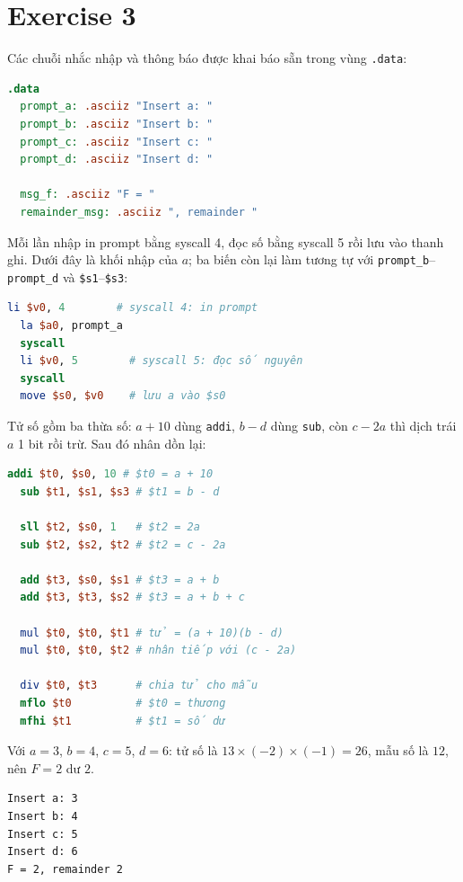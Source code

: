 \section{Exercise 3}

Các chuỗi nhắc nhập và thông báo được khai báo sẵn trong vùng \texttt{.data}:

\begin{lstlisting}[language=MIPS,numbers=none]
.data
  prompt_a: .asciiz "Insert a: "
  prompt_b: .asciiz "Insert b: "
  prompt_c: .asciiz "Insert c: "
  prompt_d: .asciiz "Insert d: "

  msg_f: .asciiz "F = "
  remainder_msg: .asciiz ", remainder "
\end{lstlisting}

Mỗi lần nhập in prompt bằng syscall 4, đọc số bằng syscall 5 rồi lưu vào thanh ghi. Dưới đây là khối nhập của $a$; ba biến còn lại làm tương tự với \texttt{prompt\_b}--\texttt{prompt\_d} và \texttt{\$s1}--\texttt{\$s3}:

\begin{lstlisting}[language=MIPS,numbers=none]
  li $v0, 4        # syscall 4: in prompt
  la $a0, prompt_a
  syscall
  li $v0, 5        # syscall 5: đọc số nguyên
  syscall
  move $s0, $v0    # lưu a vào $s0
\end{lstlisting}

Tử số gồm ba thừa số: $a+10$ dùng \texttt{addi}, $b-d$ dùng \texttt{sub}, còn $c-2a$ thì dịch trái $a$ 1 bit rồi trừ. Sau đó nhân dồn lại:

\begin{lstlisting}[language=MIPS,numbers=none]
  addi $t0, $s0, 10 # $t0 = a + 10
  sub $t1, $s1, $s3 # $t1 = b - d

  sll $t2, $s0, 1   # $t2 = 2a
  sub $t2, $s2, $t2 # $t2 = c - 2a

  add $t3, $s0, $s1 # $t3 = a + b
  add $t3, $t3, $s2 # $t3 = a + b + c

  mul $t0, $t0, $t1 # tử = (a + 10)(b - d)
  mul $t0, $t0, $t2 # nhân tiếp với (c - 2a)

  div $t0, $t3      # chia tử cho mẫu
  mflo $t0          # $t0 = thương
  mfhi $t1          # $t1 = số dư
\end{lstlisting}

Với $a=3$, $b=4$, $c=5$, $d=6$: tử số là $13 \times (-2) \times (-1) = 26$, mẫu số là $12$, nên $F = 2$ dư $2$.

\begin{lstlisting}[language={},numbers=none]
Insert a: 3
Insert b: 4
Insert c: 5
Insert d: 6
F = 2, remainder 2
\end{lstlisting}
